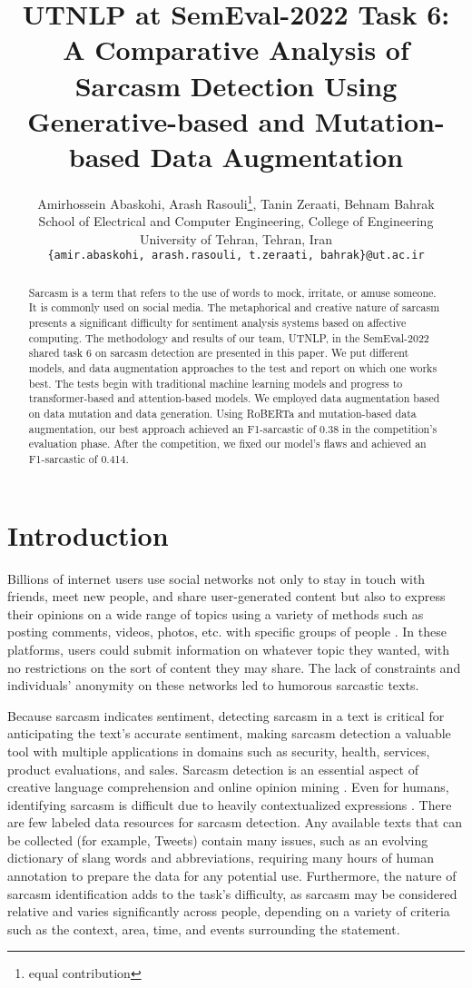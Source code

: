 \documentclass[11pt]{article}
\title{UTNLP at SemEval-2022 Task 6: A Comparative Analysis of Sarcasm
Detection Using Generative-based and Mutation-based Data Augmentation}
\author{Amirhossein Abaskohi, Arash Rasouli\thanks{equal contribution}, Tanin Zeraati\samethanks, Behnam Bahrak \\
        School of Electrical and Computer Engineering, College of Engineering \\ University of Tehran, Tehran, Iran \\ \texttt{\{amir.abaskohi, arash.rasouli, t.zeraati, bahrak\}@ut.ac.ir}}
\begin{document}
\maketitle
\begin{abstract}
Sarcasm is a term that refers to the use of words to mock, irritate, or amuse someone. It is commonly used on social media. The metaphorical and creative nature of sarcasm presents a significant difficulty for sentiment analysis systems based on affective computing. The methodology and results of our team, UTNLP, in the SemEval-2022 shared task 6 on sarcasm detection are presented in this paper. We put different models, and data augmentation approaches to the test and report on which one works best. The tests begin with traditional machine learning models and progress to transformer-based and attention-based models. We employed data augmentation based on data mutation and data generation. Using RoBERTa and mutation-based data augmentation, our best approach achieved an F1-sarcastic of 0.38 in the competition's evaluation phase. After the competition, we fixed our model's flaws and achieved an F1-sarcastic of 0.414. 
\end{abstract}

\section{Introduction}

Billions of internet users use social networks not only to stay in touch with friends, meet new people, and share user-generated content but also to express their opinions on a wide range of topics using a variety of methods such as posting comments, videos, photos, etc. with specific groups of people \cite{tungthamthiti2016recognition}. In these platforms, users could submit information on whatever topic they wanted, with no restrictions on the sort of content they may share. The lack of constraints and individuals' anonymity on these networks led to humorous sarcastic texts.

Because sarcasm indicates sentiment, detecting sarcasm in a text is critical for anticipating the text's accurate sentiment, making sarcasm detection a valuable tool with multiple applications in domains such as security, health, services, product evaluations, and sales. Sarcasm detection is an essential aspect of creative language comprehension \cite{veale2019systematizing} and online opinion mining \cite{kannangara2018mining}. Even for humans, identifying sarcasm is difficult due to heavily contextualized expressions \cite{walker2012corpus}. There are few labeled data resources for sarcasm detection. Any available texts that can be collected (for example, Tweets) contain many issues, such as an evolving dictionary of slang words and abbreviations, requiring many hours of human annotation to prepare the data for any potential use. Furthermore, the nature of sarcasm identification adds to the task's difficulty, as sarcasm may be considered relative and varies significantly across people, depending on a variety of criteria such as the context, area, time, and events surrounding the statement.
\end{document}

